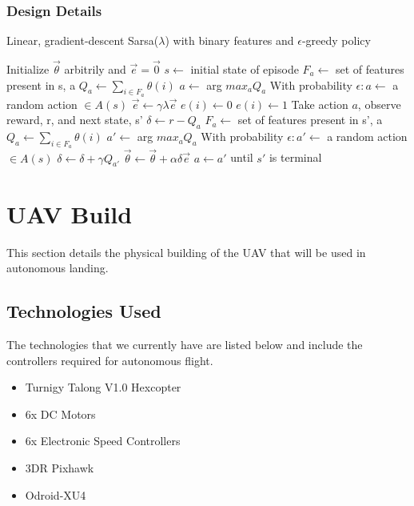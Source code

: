 \subsubsection{Design Details}
\begin{algorithm} [h]                     %
\caption{Linear, gradient-descent Sarsa($\lambda$) with binary features and $\epsilon$-greedy policy}         
\label{Sarsa}                           %
\begin{algorithmic}                    %
    \STATE Initialize $\vec{\theta}$ arbitrily and $\vec{e} = \vec{0}$
      \STATE $s \leftarrow$ initial state of episode
        \STATE $F_a \leftarrow$ set of features present in s, a
        \STATE $Q_a \leftarrow \sum_{i \in F_a}\theta(i)$
      \ENDFOR
      \STATE $a \leftarrow$ arg $max_a Q_a$
      \STATE With probability $\epsilon: a \leftarrow$ a random action $\in A(s)$
        \STATE $\vec{e} \leftarrow \gamma \lambda \vec{e}$
            \STATE $e(i) \leftarrow 0 $
          \ENDFOR
        \ENDFOR
          \STATE $e(i) \leftarrow 1 $
        \ENDFOR
        \STATE Take action $a$, observe reward, r, and next state, s'
        \STATE $\delta \leftarrow r - Q_a$
          \STATE $F_a \leftarrow$ set of features present in s', a
          \STATE $Q_a \leftarrow \sum_{i \in F_a}\theta(i)$
        \ENDFOR
        \STATE $a' \leftarrow$ arg $max_a Q_a$
        \STATE With probability $\epsilon:a' \leftarrow$ a random action $\in A(s)$
        \STATE $\delta \leftarrow \delta + \gamma Q_{a'}$
        \STATE $\vec{\theta} \leftarrow \vec{\theta} + \alpha \delta \vec{e}$
        \STATE $a \leftarrow a'$
      \ENDFOR
      \STATE until $s'$ is terminal
    \ENDFOR
\end{algorithmic}
\end{algorithm} 

\section{UAV Build}
This section details the physical building of the UAV that will be used in autonomous landing.
\subsection{Technologies  Used}
The technologies that we currently have are listed below and include the controllers required for autonomous flight.
\begin{itemize}
	\item Turnigy Talong V1.0 Hexcopter
	\item 6x DC Motors
	\item 6x Electronic Speed Controllers
	\item 3DR Pixhawk
	\item Odroid-XU4
\end{itemize}
